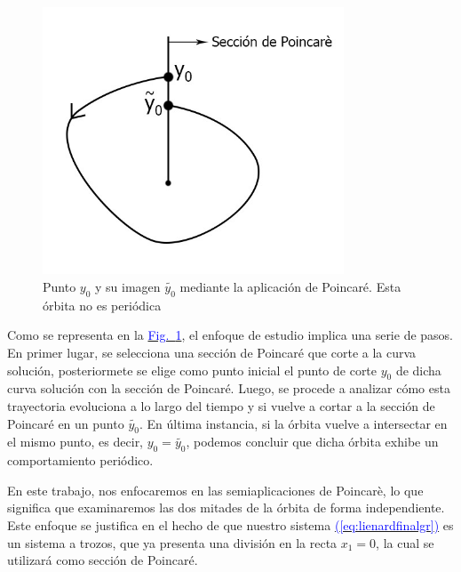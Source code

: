 \documentclass[12pt,a4paper]{report} %
\newcommand{\fref}[1]{\hyperref[#1]{\textcolor{blue}{Fig.~\ref*{#1}}}}
\newcommand{\eref}[1]{\hyperref[#1]{\textcolor{blue}{(\ref*{#1})}}}
\newcommand{\fref}[1]{\hyperref[#1]{\textcolor{blue}{\textit{Fig.~\ref*{#1}}}}}
\newcommand{\eref}[1]{\hyperref[#1]{\textcolor{blue}{\textit{(\ref*{#1})}}}}
\begin{document}
	\begin{figure}[h]
		\centering
		\includegraphics[width=0.8\textwidth]{aplipoincare2.jpg}
		\caption{Punto $y_0$ y su imagen $\tilde{y_0}$ mediante la aplicación de Poincaré. Esta órbita no es periódica}
		\label{fig:aplipoincare2}
	\end{figure}\smallskip

 Como se representa en la \fref{fig:aplipoincare2}, el enfoque de estudio implica una serie de pasos. En primer lugar, se selecciona una sección de Poincaré que corte a la curva solución, posteriormete se elige como punto inicial el punto de corte $y_0$ de dicha curva solución con la sección de Poincaré. Luego, se procede a analizar cómo esta trayectoria evoluciona a lo largo del tiempo y si vuelve a cortar a la sección de Poincaré en un punto $\tilde{y_0}$. En última instancia, si la órbita vuelve a intersectar en el mismo punto, es decir, $y_0=\tilde{y_0}$, podemos concluir que dicha órbita exhibe un comportamiento periódico.

	\newpage
	
	En este trabajo, nos enfocaremos en las semiaplicaciones de Poincarè, lo que significa que examinaremos las dos mitades de la órbita de forma independiente. Este enfoque se justifica en el hecho de que nuestro sistema \eref{eq:lienardfinalgr} es un sistema a trozos, que ya presenta una división en la recta $x_1=0$, la cual se utilizará como sección de Poincaré.
	
\end{document}
